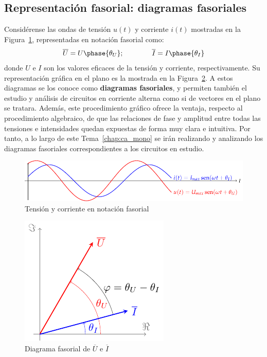 \subsection{Representación fasorial: diagramas fasoriales}
	
Considérense las ondas de tensión $u(t)$ y corriente $i(t)$ mostradas
en la Figura~\ref{fig:ondasTensionCorriente}, representadas en
notación fasorial como:
\begin{equation*}
  \overline{U} = U\phase{\theta_U};\qquad\qquad   \overline{I} = I\phase{\theta_I}
\end{equation*}
donde $U$ e $I$ son los valores eficaces de la tensión y corriente,
respectivamente. Su representación gráfica en el plano es la mostrada
en la Figura~\ref{fig:fasortensioncorriente}. A estos diagramas se los
conoce como \textbf{diagramas fasoriales}, y permiten también el
estudio y análisis de circuitos en corriente alterna como si de
vectores en el plano se tratara. Además, este procedimiento gráfico
ofrece la ventaja, respecto al procedimiento algebraico, de que las
relaciones de fase y amplitud entre todas las tensiones e intensidades
quedan expuestas de forma muy clara e intuitiva. Por tanto, a lo largo
de este Tema~\ref{chap:ca_mono} se irán realizando y analizando los
diagramas fasoriales correspondientes a los circuitos en estudio.
	
\begin{figure}[H]
  \centering
  \includegraphics[width=.9\linewidth]{../figs/ondasTensionCorriente.pdf}
  \caption{Tensión y corriente en notación fasorial}
  \label{fig:ondasTensionCorriente}
\end{figure}
	
	
\begin{figure}[H]
  \centering
  \includegraphics[width=0.3\linewidth]{../figs/fasorTensionCorriente.pdf}
  \caption{Diagrama fasorial de $\overline{U}$ e $\overline{I}$}
  \label{fig:fasortensioncorriente}
\end{figure}
	
